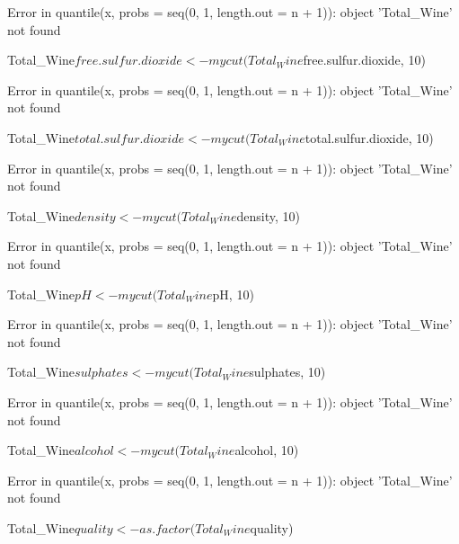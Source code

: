 \documentclass[letterpaper]{article}\usepackage[]{graphicx}\usepackage[]{color}
\begin{document}
\begin{Schunk}
\begin{Sinput}
\end{Sinput}
\begin{Soutput}
Error in quantile(x, probs = seq(0, 1, length.out = n + 1)): object 'Total_Wine' not found
\end{Soutput}
\begin{Sinput}
Total_Wine$free.sulfur.dioxide <- mycut(Total_Wine$free.sulfur.dioxide, 10)
\end{Sinput}
\begin{Soutput}
Error in quantile(x, probs = seq(0, 1, length.out = n + 1)): object 'Total_Wine' not found
\end{Soutput}
\begin{Sinput}
Total_Wine$total.sulfur.dioxide <- mycut(Total_Wine$total.sulfur.dioxide, 10)
\end{Sinput}
\begin{Soutput}
Error in quantile(x, probs = seq(0, 1, length.out = n + 1)): object 'Total_Wine' not found
\end{Soutput}
\begin{Sinput}
Total_Wine$density <- mycut(Total_Wine$density, 10)
\end{Sinput}
\begin{Soutput}
Error in quantile(x, probs = seq(0, 1, length.out = n + 1)): object 'Total_Wine' not found
\end{Soutput}
\begin{Sinput}
Total_Wine$pH <- mycut(Total_Wine$pH, 10)
\end{Sinput}
\begin{Soutput}
Error in quantile(x, probs = seq(0, 1, length.out = n + 1)): object 'Total_Wine' not found
\end{Soutput}
\begin{Sinput}
Total_Wine$sulphates <- mycut(Total_Wine$sulphates, 10)
\end{Sinput}
\begin{Soutput}
Error in quantile(x, probs = seq(0, 1, length.out = n + 1)): object 'Total_Wine' not found
\end{Soutput}
\begin{Sinput}
Total_Wine$alcohol <- mycut(Total_Wine$alcohol, 10)
\end{Sinput}
\begin{Soutput}
Error in quantile(x, probs = seq(0, 1, length.out = n + 1)): object 'Total_Wine' not found
\end{Soutput}
\begin{Sinput}
Total_Wine$quality <- as.factor(Total_Wine$quality)
\end{Sinput}

\end{Schunk}
\end{document}
